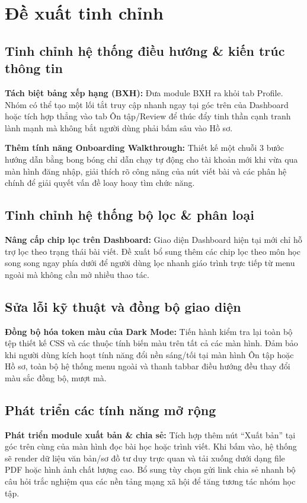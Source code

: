 \documentclass[12pt,a4paper]{report}
\begin{document}
\section{Đề xuất tinh chỉnh}

\subsection*{Tinh chỉnh hệ thống điều hướng \& kiến trúc thông tin}
\textbf{Tách biệt bảng xếp hạng (BXH):} Đưa module BXH ra khỏi tab Profile. Nhóm có thể tạo một lối tắt truy cập nhanh ngay tại góc trên của Dashboard hoặc tích hợp thẳng vào tab Ôn tập/Review để thúc đẩy tinh thần cạnh tranh lành mạnh mà không bắt người dùng phải bấm sâu vào Hồ sơ.

\textbf{Thêm tính năng Onboarding Walkthrough:} Thiết kế một chuỗi 3 bước hướng dẫn bằng bong bóng chỉ dẫn chạy tự động cho tài khoản mới khi vừa qua màn hình đăng nhập, giải thích rõ công năng của nút viết bài và các phân hệ chính để giải quyết vấn đề loay hoay tìm chức năng.

\subsection*{Tinh chỉnh hệ thống bộ lọc \& phân loại}
\textbf{Nâng cấp chip lọc trên Dashboard:} Giao diện Dashboard hiện tại mới chỉ hỗ trợ lọc theo trạng thái bài viết. Đề xuất bổ sung thêm các chip lọc theo môn học song song ngay phía dưới để người dùng lọc nhanh giáo trình trực tiếp từ menu ngoài mà không cần mở nhiều thao tác.

\subsection*{Sửa lỗi kỹ thuật và đồng bộ giao diện}
\textbf{Đồng bộ hóa token màu của Dark Mode:} Tiến hành kiểm tra lại toàn bộ tệp thiết kế CSS và các thuộc tính biến màu trên tất cả các màn hình. Đảm bảo khi người dùng kích hoạt tính năng đổi nền sáng/tối tại màn hình Ôn tập hoặc Hồ sơ, toàn bộ hệ thống menu ngoài và thanh tabbar điều hướng đều thay đổi màu sắc đồng bộ, mượt mà.

\subsection*{Phát triển các tính năng mở rộng}
\textbf{Phát triển module xuất bản \& chia sẻ:} Tích hợp thêm nút ``Xuất bản'' tại góc trên cùng của màn hình đọc bài học hoặc trình viết. Khi bấm vào, hệ thống sẽ render dữ liệu văn bản/sơ đồ tư duy trực quan và tải xuống dưới dạng file PDF hoặc hình ảnh chất lượng cao. Bổ sung tùy chọn gửi link chia sẻ nhanh bộ câu hỏi trắc nghiệm qua các nền tảng mạng xã hội để tăng tương tác nhóm học tập.
\end{document}
